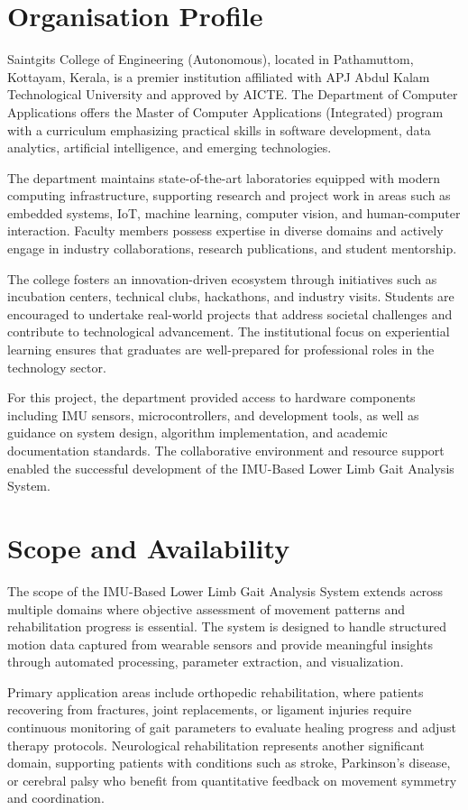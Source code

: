 \documentclass[12pt,a4paper]{report}
\begin{document}
\section{Organisation Profile}
Saintgits College of Engineering (Autonomous), located in Pathamuttom, Kottayam, Kerala, is a premier institution affiliated with APJ Abdul Kalam Technological University and approved by AICTE. The Department of Computer Applications offers the Master of Computer Applications (Integrated) program with a curriculum emphasizing practical skills in software development, data analytics, artificial intelligence, and emerging technologies.

The department maintains state-of-the-art laboratories equipped with modern computing infrastructure, supporting research and project work in areas such as embedded systems, IoT, machine learning, computer vision, and human-computer interaction. Faculty members possess expertise in diverse domains and actively engage in industry collaborations, research publications, and student mentorship.

The college fosters an innovation-driven ecosystem through initiatives such as incubation centers, technical clubs, hackathons, and industry visits. Students are encouraged to undertake real-world projects that address societal challenges and contribute to technological advancement. The institutional focus on experiential learning ensures that graduates are well-prepared for professional roles in the technology sector.

For this project, the department provided access to hardware components including IMU sensors, microcontrollers, and development tools, as well as guidance on system design, algorithm implementation, and academic documentation standards. The collaborative environment and resource support enabled the successful development of the IMU-Based Lower Limb Gait Analysis System.

\section{Scope and Availability}
The scope of the IMU-Based Lower Limb Gait Analysis System extends across multiple domains where objective assessment of movement patterns and rehabilitation progress is essential. The system is designed to handle structured motion data captured from wearable sensors and provide meaningful insights through automated processing, parameter extraction, and visualization.

Primary application areas include orthopedic rehabilitation, where patients recovering from fractures, joint replacements, or ligament injuries require continuous monitoring of gait parameters to evaluate healing progress and adjust therapy protocols. Neurological rehabilitation represents another significant domain, supporting patients with conditions such as stroke, Parkinson's disease, or cerebral palsy who benefit from quantitative feedback on movement symmetry and coordination.
\end{document}
